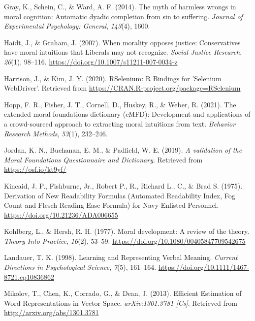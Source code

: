 \documentclass[
  english,
  man]{apa6}
\newlength{\cslhangindent}
\newlength{\cslentryspacingunit} %
\newenvironment{CSLReferences}[2] %
 {%
  \setlength{\parindent}{0pt}
  \ifodd #1
  \let\oldpar\par
  \def\par{\hangindent=\cslhangindent\oldpar}
  \fi
  \setlength{\parskip}{#2\cslentryspacingunit}
 }%
 {}
\begin{document}
\begin{CSLReferences}{1}{0}
\leavevmode{}%
Gray, K., Schein, C., \& Ward, A. F. (2014). The myth of harmless wrongs in moral cognition: Automatic dyadic completion from sin to suffering. \emph{Journal of Experimental Psychology: General}, \emph{143}(4), 1600.

\leavevmode{}%
Haidt, J., \& Graham, J. (2007). {When morality opposes justice: Conservatives have moral intuitions that Liberals may not recognize}. \emph{Social Justice Research}, \emph{20}(1), 98--116. \url{https://doi.org/10.1007/s11211-007-0034-z}

\leavevmode{}%
Harrison, J., \& Kim, J. Y. (2020). {RSelenium}: {R} {Bindings} for '{Selenium} {WebDriver}'. Retrieved from \url{https://CRAN.R-project.org/package=RSelenium}

\leavevmode{}%
Hopp, F. R., Fisher, J. T., Cornell, D., Huskey, R., \& Weber, R. (2021). The extended moral foundations dictionary (eMFD): Development and applications of a crowd-sourced approach to extracting moral intuitions from text. \emph{Behavior Research Methods}, \emph{53}(1), 232--246.

\leavevmode{}%
Jordan, K. N., Buchanan, E. M., \& Padfield, W. E. (2019). \emph{{A validation of the Moral Foundations Questionnaire and Dictionary}}. Retrieved from \url{https://osf.io/kt9yf/}

\leavevmode{}%
Kincaid, J. P., Fishburne, Jr., Robert P., R., Richard L., C., \& Brad S. (1975). {Derivation of New Readability Formulas (Automated Readability Index, Fog Count and Flesch Reading Ease Formula) for Navy Enlisted Personnel}. \url{https://doi.org/10.21236/ADA006655}

\leavevmode{}%
Kohlberg, L., \& Hersh, R. H. (1977). {Moral development: A review of the theory}. \emph{Theory Into Practice}, \emph{16}(2), 53--59. \url{https://doi.org/10.1080/00405847709542675}

\leavevmode{}%
Landauer, T. K. (1998). {Learning and Representing Verbal Meaning}. \emph{Current Directions in Psychological Science}, \emph{7}(5), 161--164. \url{https://doi.org/10.1111/1467-8721.ep10836862}

\leavevmode{}%
Mikolov, T., Chen, K., Corrado, G., \& Dean, J. (2013). Efficient {Estimation} of {Word} {Representations} in {Vector} {Space}. \emph{arXiv:1301.3781 {[}Cs{]}}. Retrieved from \url{http://arxiv.org/abs/1301.3781}


\end{CSLReferences}
\end{document}
